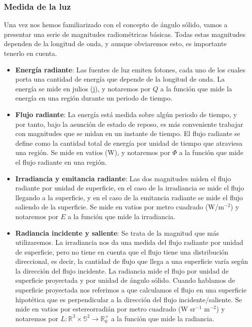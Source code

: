 \subsubsection*{Medida de la luz}

Una vez nos hemos familiarizado con el concepto de ángulo sólido, vamos a presentar una serie de magnitudes radiométricas básicas. Todas estas magnitudes dependen de la longitud de onda, y aunque obviaremos esto, es importante tenerlo en cuenta.

\begin{itemize}
\item \textbf{Energía radiante}: Las fuentes de luz emiten fotones, cada uno de los cuales porta una cantidad de energía que depende de la longitud de onda. La energía se mide en julios (j), y notaremos por $Q$ a la función que mide la energía en una región durante un periodo de tiempo.
\item \textbf{Flujo radiante}: La energía está medida sobre algún periodo de tiempo, y por tanto, bajo la asunción de estado de reposo, es más conveniente trabajar con magnitudes que se midan en un instante de tiempo. El flujo radiante se define como la cantidad total de energía por unidad de tiempo que atraviesa una región. Se mide en vatios (W), y notaremos por $\Phi$ a la función que mide el flujo radiante en una región.
\item \textbf{Irradiancia y emitancia radiante}: Las dos magnitudes miden el flujo radiante por unidad de superficie, en el caso de la irradiancia se mide el flujo llegando a la superficie, y en el caso de la emitancia radiante se mide el flujo saliendo de la superficie. Se mide en vatios por metro cuadrado (W/m$^{-2}$) y notaremos por $E$ a la función que mide la irradiancia.

\item \textbf{Radiancia incidente y saliente}: Se trata de la magnitud que más utilizaremos. La irradiancia nos da una medida del flujo radiante por unidad de superficie, pero no tiene en cuenta que el flujo tiene una distribución direccional, es decir, la cantidad de flujo que llega a una superficie varía según la dirección del flujo incidente. La radiancia mide el flujo por unidad de superficie proyectada y por unidad de ángulo sólido. Cuando hablamos de superficie proyectada nos referimos a que calculamos el flujo en una superficie hipotética que es perpendicular a la dirección del flujo incidente/saliente. Se mide en vatios por estereorradián por metro cuadrado (W sr$^{-1}$ m$^{-2}$) y notaremos por $L: \mathds{R^3} \times \mathds{S}^2\rightarrow \mathds{R}^+_0$ a la función que mide la radiancia.


\end{itemize}
